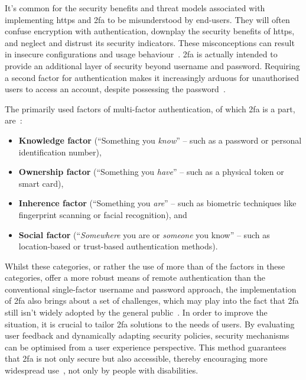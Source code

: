 It's common for the security benefits and threat models associated with implementing \ac{https} and \ac{2fa} to be misunderstood by end-users. They will often confuse encryption with authentication, downplay the security benefits of \ac{https}, and neglect and distrust its security indicators. These misconceptions can result in insecure configurations and usage behaviour~\cite{krombholz_2019}. \Ac{2fa} is actually intended to provide an additional layer of security beyond username and password. Requiring a second factor for authentication makes it increasingly arduous for unauthorised users to access an account, despite possessing the password~\cite{schneier_2005}.

The primarily used factors of multi-factor authentication, of which \ac{2fa} is a part, are~\cite{abhishek_2013}:

\begin{itemize}
    \item \textbf{Knowledge factor} (\enquote{Something you \textit{know}} -- such as a password or personal identification number),
    \item \textbf{Ownership factor} (\enquote{Something you \textit{have}} -- such as a physical token or smart card), 
    \item \textbf{Inherence factor} (\enquote{Something you \textit{are}} -- such as biometric techniques like fingerprint scanning or facial recognition), and
    \item \textbf{Social factor} (\enquote{\textit{Somewhere} you are or \textit{someone} you know} -- such as location-based or trust-based authentication methods).
\end{itemize}

\pspace{}Whilst these categories, or rather the use of more than of the factors in these categories, offer a more robust means of remote authentication than the conventional single-factor username and password approach, the implementation of \ac{2fa} also brings about a set of challenges, which may play into the fact that \ac{2fa} still isn't widely adopted by the general public~\cite{farke_2020}. In order to improve the situation, it is crucial to tailor \ac{2fa} solutions to the needs of users. By evaluating user feedback and dynamically adapting security policies, security mechanisms can be optimised from a user experience perspective. This method guarantees that \ac{2fa} is not only secure but also accessible, thereby encouraging more widespread use~\cite{feth_2015}, not only by people with disabilities.

